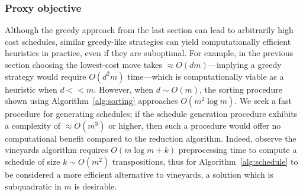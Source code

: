 \documentclass{article} %
\begin{document}
\subsubsection{Proxy objective}\label{sec:proxy_objective}
Although the greedy approach from the last section can lead to arbitrarily high cost schedules, similar greedy-like strategies can yield computationally efficient heuristics in practice, even if they are suboptimal. 
For example, in the previous section choosing the lowest-cost move takes $\approx O(dm)$---implying a greedy strategy would require $O(d^2 m)$ time---which is computationally viable as a heuristic when $d << m$. 
However, when $d \sim O(m)$, the sorting procedure shown using Algorithm~\ref{alg:sorting} approaches $O(m^2 \log m)$. We seek a fast procedure for generating schedules; if the schedule generation procedure exhibits a complexity of $\approx O(m^3)$ or higher, then such a procedure would offer no computational benefit compared to the reduction algorithm. 
Indeed, observe the vineyards algorithm requires $O(m \log m + k)$ preprocessing time to compute a schedule of size $k \sim O(m^2)$ transpositions, thus for Algorithm~\ref{alg:schedule} to be considered a more efficient alternative to vineyards, a solution which is subquadratic in $m$ is desirable. 
\end{document}
